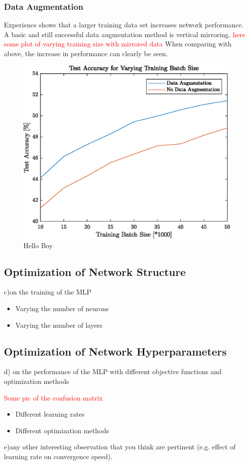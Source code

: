 \subsubsection{Data Augmentation}
	    	
   	Experience shows that a larger training data set increases network performance. A basic and still successful data augmentation method is vertical mirroring. \textcolor{red}{here some plot of varying training size with mirrored data} When comparing with above, the increase in performance can clearly be seen.
   	
   	\begin{figure}[h!]
		\centering
   	  	\includegraphics{images/dataAugmentation}
   	  	\caption{Hello Boy}
   	  	\label{fig:test1}
   	\end{figure}
   		    
\subsection{Optimization of Network Structure}\label{subsec:netStruct}
c)on the training of the MLP    
\begin{itemize}
   	\item Varying the number of neurons	
	\item Varying the number of layers	    	
\end{itemize}
	    
\subsection{Optimization of Network Hyperparameters}\label{subsec:optNet}
d) on the performance of the MLP with different objective functions and optimization methods

\textcolor{red}{Some pic of the confusion matrix}

\begin{itemize}
   	\item Different learning rates
	    	
   	\item Different optimization methods
\end{itemize}
e)any other interesting observation that you think are pertinent (e.g. effect of learning rate on convergence speed).
